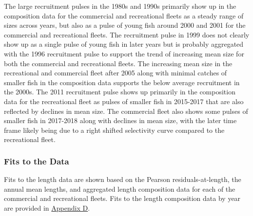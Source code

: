 \documentclass[11pt,
  english,
  a4paper,
]{article}
\begin{document}
The large recruitment pulses in the 1980s and 1990s primarily show up in the composition data for the commercial and recreational fleets as a steady range of sizes across years, but also as a pulse of young fish around 2000 and 2001 for the commercial and recreational fleets. The recruitment pulse in 1999 does not clearly show up as a single pulse of young fish in later years but is probably aggregated with the 1996 recruitment pulse to support the trend of increasing mean size for both the commercial and recreational fleets. The increasing mean size in the recreational and commercial fleet after 2005 along with minimal catches of smaller fish in the composition data supports the below average recruitment in the 2000s. The 2011 recruitment pulse shows up primarily in the composition data for the recreational fleet as pulses of smaller fish in 2015-2017 that are also reflected by declines in mean size. The commercial fleet also shows some pulses of smaller fish in 2017-2018 along with declines in mean size, with the later time frame likely being due to a right shifted selectivity curve compared to the recreational fleet.

\leavevmode\tagmcend\tagstructend\par


\hypertarget{fits-to-the-data}{%
\subsubsection{Fits to the Data}\label{fits-to-the-data}}

\leavevmode\tagmcend\tagstructend


Fits to the length data are shown based on the Pearson residuals-at-length, the annual mean lengths, and aggregated length composition data for each of the commercial and recreational fleets. Fits to the length composition data by year are provided in {\protect\hyperlink{append_d}{Appendix D}\leavevmode\tagmcend\tagstructend}.

\leavevmode\tagmcend\tagstructend\par

\end{document}

